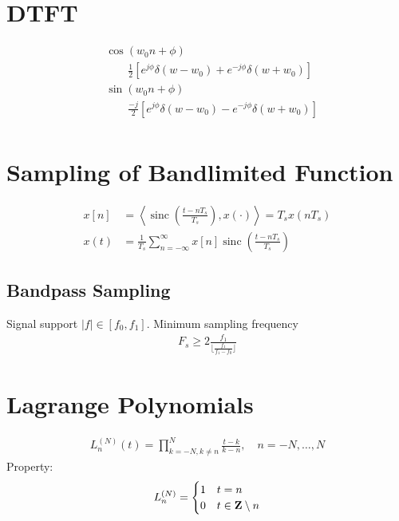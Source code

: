 \documentclass[a4paper]{IEEEtran}
\DeclareMathOperator{\sinc}{sinc}
\begin{document}
\section{DTFT}

\begin{align}
&\cos(w_0n+\phi)\\\nonumber
&\qquad\frac{1}{2}\left[e^{j\phi}\delta(w-w_0)+e^{-j\phi}\delta(w+w_0)\right]\\
&\sin(w_0n+\phi)\nonumber\\
&\qquad\frac{-j}{2}\left[e^{j\phi}\delta(w-w_0)-e^{-j\phi}\delta(w+w_0)\right]\\
\end{align}

\section{Sampling of Bandlimited Function}
\begin{align}
x[n] &= \left<\sinc\left(\frac{t-nT_s}{T_s}\right), x(\cdot)\right>=T_s x(nT_s)\\
x(t) &= \frac{1}{T_s}\sum_{n=-\infty}^\infty x[n]\sinc\left(\frac{t-nT_s}{T_s}\right)
\end{align}
\subsection{Bandpass Sampling}
Signal support $|f|\in[f_0,f_1]$. Minimum sampling frequency
\begin{align}
F_s\geq 2\frac{f_1}{\lfloor\frac{f_1}{f_1-f_0}\rfloor}
\end{align}
\section{Lagrange Polynomials}
\begin{align}
L_n^{(N)}(t)=\prod_{k=-N, k\neq n}^N \frac{t-k}{k-n},\quad n=-N,\dotsc, N
\end{align}
Property:
\begin{align*}
L_n^{(N)}=\begin{cases}1& t=n\\0 & t\in \mathbf{Z}\setminus n\end{cases}
\end{align*}
\end{document}
